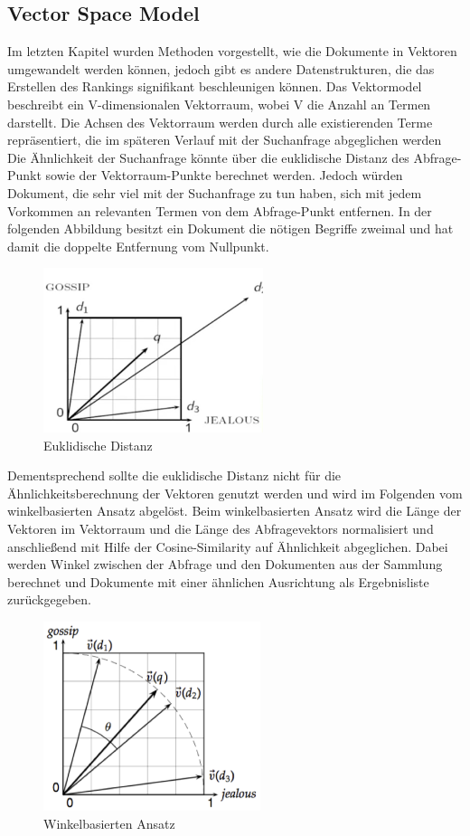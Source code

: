 \subsection[Vector Space Model ]{Vector Space Model }
Im letzten Kapitel wurden Methoden vorgestellt, wie die Dokumente in
Vektoren umgewandelt werden können, jedoch gibt es andere
Datenstrukturen, die das Erstellen des Rankings signifikant
beschleunigen können.
\newline
Das Vektormodel beschreibt ein V-dimensionalen Vektorraum, wobei V die
Anzahl an Termen darstellt. Die Achsen des Vektorraum werden durch alle
existierenden Terme repräsentiert, die im späteren Verlauf mit der
Suchanfrage abgeglichen werden
\newline
Die Ähnlichkeit der Suchanfrage könnte über die euklidische Distanz des
Abfrage-Punkt sowie der Vektorraum-Punkte berechnet werden. Jedoch
würden Dokument, die sehr viel mit der Suchanfrage zu tun haben, sich
mit jedem Vorkommen an relevanten Termen von dem Abfrage-Punkt
entfernen. In der folgenden Abbildung besitzt ein Dokument die nötigen
Begriffe zweimal und hat damit die doppelte Entfernung vom Nullpunkt.
\begin{figure}[h]
\centering
\includegraphics[width=6.435cm,height=4.81cm]{bilder/SeminararbeitArkadij-img6.png}
\caption {Euklidische Distanz \cite {manning2008introduction}}
\end{figure}
Dementsprechend sollte die euklidische Distanz nicht für die
Ähnlichkeitsberechnung der Vektoren genutzt werden und wird im
Folgenden vom winkelbasierten Ansatz abgelöst. 
\bigbreak
Beim winkelbasierten Ansatz wird die Länge der Vektoren im Vektorraum
und die Länge des Abfragevektors normalisiert und anschließend mit
Hilfe der Cosine-Similarity auf Ähnlichkeit abgeglichen.
\newline
Dabei werden Winkel zwischen der Abfrage und den Dokumenten aus der
Sammlung berechnet und Dokumente mit einer ähnlichen Ausrichtung als
Ergebnisliste zurückgegeben.
\bigbreak
\begin{figure}[H]
\centering
\includegraphics[width=6.361cm,height=5.528cm]{bilder/SeminararbeitArkadij-img7.png}
\caption {Winkelbasierten Ansatz \cite {manning2008introduction}}

\end{figure}
